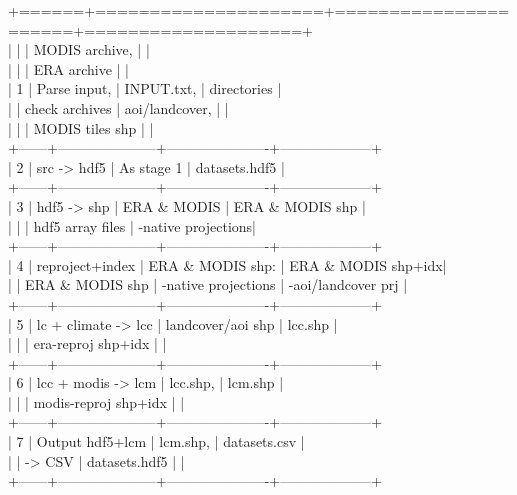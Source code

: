 \documentclass[twoside,a4paper]{refart}
\begin{document}
    +======+=====================+======================+====================+\\
    |      |                     | MODIS archive,       |                    |\\
    |      |                     | ERA archive          |                    |\\
    | 1    | Parse input,        | INPUT.txt,           | directories        |\\
    |      | check archives      | aoi/landcover,       |                    |\\
    |      |                     | MODIS tiles shp      |                    |\\
    +------+---------------------+----------------------+--------------------+\\
    | 2    | src -> hdf5         | As stage 1           | datasets.hdf5      |\\
    +------+---------------------+----------------------+--------------------+\\
    | 3    | hdf5 -> shp         | ERA \& MODIS          | ERA \& MODIS shp    |\\
    |      |                     | hdf5 array files     | -native projections|\\
    +------+---------------------+----------------------+--------------------+\\
    | 4    | reproject+index     | ERA \& MODIS shp:     | ERA \& MODIS shp+idx|\\
    |      | ERA \& MODIS shp     | -native projections  | -aoi/landcover prj |\\
    +------+---------------------+----------------------+--------------------+\\
    | 5    | lc + climate -> lcc | landcover/aoi shp    | lcc.shp            |\\
    |      |                     | era-reproj shp+idx   |                    |\\
    +------+---------------------+----------------------+--------------------+\\
    | 6    | lcc + modis -> lcm  | lcc.shp,             | lcm.shp            |\\
    |      |                     | modis-reproj shp+idx |                    |\\
    +------+---------------------+----------------------+--------------------+\\
    | 7    |  Output hdf5+lcm    | lcm.shp,             | datasets.csv       |\\
    |      |  -> CSV             | datasets.hdf5        |                    |\\
    +------+---------------------+----------------------+--------------------+\\
\end{document}

